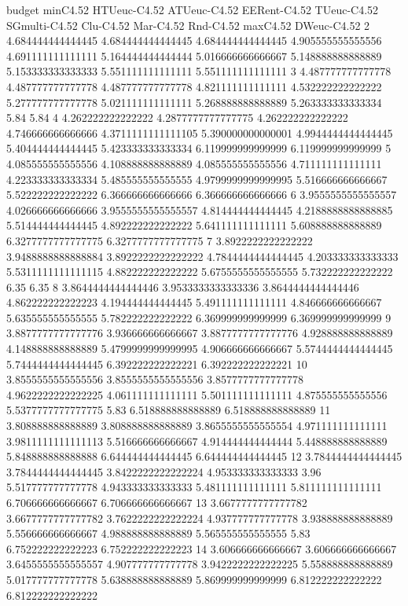 budget minC4.52 HTUeuc-C4.52 ATUeuc-C4.52 EERent-C4.52 TUeuc-C4.52 SGmulti-C4.52 Clu-C4.52 Mar-C4.52 Rnd-C4.52 maxC4.52 DWeuc-C4.52
2 4.684444444444445 4.684444444444445 4.684444444444445 4.905555555555556 4.691111111111111 5.164444444444444 5.016666666666667 5.148888888888889 5.153333333333333 5.551111111111111 5.551111111111111
3 4.487777777777778 4.487777777777778 4.487777777777778 4.821111111111111 4.532222222222222 5.277777777777778 5.021111111111111 5.268888888888889 5.263333333333334 5.84 5.84
4 4.262222222222222 4.2877777777777775 4.262222222222222 4.746666666666666 4.3711111111111105 5.390000000000001 4.9944444444444445 5.404444444444445 5.423333333333334 6.119999999999999 6.119999999999999
5 4.085555555555556 4.108888888888889 4.085555555555556 4.711111111111111 4.223333333333334 5.485555555555555 4.9799999999999995 5.516666666666667 5.522222222222222 6.366666666666666 6.366666666666666
6 3.9555555555555557 4.026666666666666 3.9555555555555557 4.814444444444445 4.2188888888888885 5.514444444444445 4.892222222222222 5.641111111111111 5.608888888888889 6.3277777777777775 6.3277777777777775
7 3.8922222222222222 3.9488888888888884 3.8922222222222222 4.7844444444444445 4.203333333333333 5.5311111111111115 4.882222222222222 5.6755555555555555 5.732222222222222 6.35 6.35
8 3.8644444444444446 3.9533333333333336 3.8644444444444446 4.862222222222223 4.194444444444445 5.491111111111111 4.846666666666667 5.635555555555555 5.782222222222222 6.369999999999999 6.369999999999999
9 3.8877777777777776 3.936666666666667 3.8877777777777776 4.928888888888889 4.148888888888889 5.4799999999999995 4.906666666666667 5.5744444444444445 5.7444444444444445 6.392222222222221 6.392222222222221
10 3.8555555555555556 3.8555555555555556 3.8577777777777778 4.9622222222222225 4.061111111111111 5.501111111111111 4.875555555555556 5.5377777777777775 5.83 6.518888888888889 6.518888888888889
11 3.808888888888889 3.808888888888889 3.8655555555555554 4.971111111111111 3.9811111111111113 5.516666666666667 4.914444444444444 5.448888888888889 5.848888888888888 6.644444444444445 6.644444444444445
12 3.7844444444444445 3.7844444444444445 3.8422222222222224 4.953333333333333 3.96 5.517777777777778 4.943333333333333 5.481111111111111 5.811111111111111 6.706666666666667 6.706666666666667
13 3.6677777777777782 3.6677777777777782 3.7622222222222224 4.937777777777778 3.938888888888889 5.556666666666667 4.988888888888889 5.565555555555555 5.83 6.752222222222223 6.752222222222223
14 3.606666666666667 3.606666666666667 3.6455555555555557 4.907777777777778 3.9422222222222225 5.558888888888889 5.017777777777778 5.638888888888889 5.869999999999999 6.812222222222222 6.812222222222222
